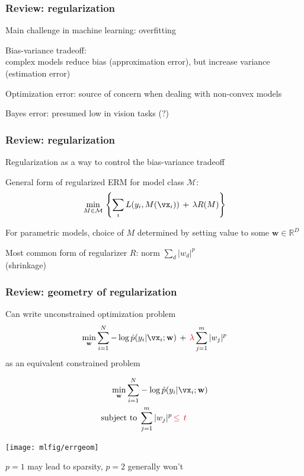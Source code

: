 \documentclass[xcolor=dvipsnames]{beamer}
\begin{document}
\begin{frame}
  \frametitle{Review: regularization}
  \bi
\item Main challenge in machine learning: overfitting
\item Bias-variance tradeoff:\\
complex models reduce bias (approximation error), but increase
variance (estimation error)
\item Optimization error: source of concern when dealing with
  non-convex models
\item Bayes error: presumed low in vision tasks (?)
\ei
\end{frame}


\begin{frame}
  \frametitle{Review: regularization}
\bi
\item Regularization as a way to control the bias-variance tradeoff
\item General form of regularized ERM for model class $\mathcal{M}$:
\[\min_{M\in\mathcal{M}}\,\left\{ \sum_i L(y_i,M(\vx_i))\,+\,\lambda R(M)
\right\}
\]
\item For parametric models, choice of $M$ determined by setting value
  to some $\mathbf{w}\in\mathbb{R}^D$
\item Most common form of regularizer $R$: norm $\sum_d|w_d|^p$ \\
(shrinkage)
\ei  
\end{frame}


\begin{frame}
  \frametitle{Review: geometry of regularization}
  \bi
\item Can write unconstrained optimization problem
\[\min_{\mathbf{w}}\sum_{i=1}^N-\log\hat{p}(y_i|\vx_i;\mathbf{w})\,+\,\textcolor{red}{\lambda}\sum_{j=1}^m|w_j|^p
\] 
as an equivalent constrained problem
\ei
\begin{minipage}[c]{.45\textwidth}

\begin{align*}
  \min_{\mathbf{w}}\sum_{i=1}^N&-\log\hat{p}(y_i|\vx_i;\mathbf{w})\\
  \text{subject to}\;&\sum_{j=1}^m|w_j|^p\,\textcolor{red}{\le\,t}
\end{align*}
\end{minipage}%
\begin{minipage}[c]{.55\textwidth}
\texttt{[image: mlfig/errgeom]}
\end{minipage}

\bi
 \item<1-> $p=1$ may lead to sparsity, $p=2$ generally won't
\ei

\end{frame}
\end{document}
